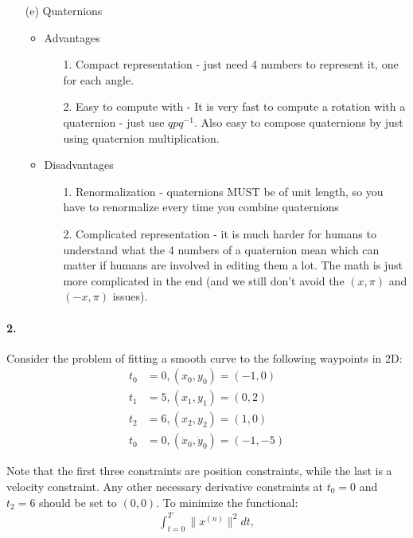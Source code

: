 \documentclass[english]{article}
\begin{document}
\begin{enumerate}
 \item[(e)] Quaternions 
    \begin{itemize}
     \item Advantages
     \begin{enumerate}
      \item[1.] Compact representation - just need 4 numbers to represent it, one for each angle.
      \item[2.] Easy to compute with - It is very fast to compute a rotation with a quaternion - just use $qpq^{-1}$. Also easy to compose quaternions by just using quaternion multiplication. 
     \end{enumerate}
     \item Disadvantages
     \begin{enumerate}
      \item[1.] Renormalization - quaternions MUST be of unit length, so you have to renormalize every time you combine quaternions
      \item[2.] Complicated representation - it is much harder for humans to understand what the 4 numbers of a quaternion mean which can matter if humans are involved in editing them a lot. The math is just more complicated in the end (and we still don't avoid the $(x,\pi)$ and $(-x,\pi)$ issues).
     \end{enumerate}
    \end{itemize}

\end{enumerate}



\paragraph{2.}  
Consider the problem of fitting a smooth curve to the following waypoints in 2D: 
\begin{align*}
t_0 &= 0, (x_0, y_0) = (-1, 0) \\
t_1 &= 5, (x_1, y_1) = (0, 2) \\
t_2 &= 6, (x_2, y_2) = (1, 0) \\
t_0 &= 0, (\dot{x}_0, \dot{y}_0) = (-1, -5) 
\end{align*}

Note that the first three constraints are position constraints, while the last is a velocity constraint. Any other necessary derivative constraints at $t_0 = 0$ and $t_2 = 6$ should be set to $(0, 0)$. To minimize the functional:
\begin{align}
\int_{t = 0}^T \| x^{(n)} \|^2 dt,
\end{align}
\end{document}
